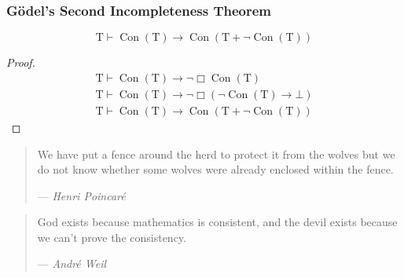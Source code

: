 \documentclass[UTF8,aspectratio=43,11pt,colorlinks,compress,openany]{beamer}%
\begin{document}
\begin{frame}\frametitle{G\"odel's Second Incompleteness Theorem}
\setlength\abovedisplayskip{0pt}
\setlength\belowdisplayskip{0pt}
	\begin{block}{}
		\[\mathrm{T}\vdash\operatorname{Con}(\mathrm{T})\to\operatorname{Con}(\mathrm{T}+\neg\operatorname{Con}(\mathrm{T}))\]
	\end{block}
	\begin{proof}
		\begin{gather*}
		\mathrm{T}\vdash\operatorname{Con}(\mathrm{T})\to\neg\Box \operatorname{Con}(\mathrm{T})\\
		\mathrm{T}\vdash\operatorname{Con}(\mathrm{T})\to\neg\Box (\neg\operatorname{Con}(\mathrm{T})\to\bot)\\
		\mathrm{T}\vdash\operatorname{Con}(\mathrm{T})\to\operatorname{Con}(\mathrm{T}+\neg\operatorname{Con}(\mathrm{T}))
		\end{gather*}
	\end{proof}
\begin{quote}
We have put a fence around the herd to protect it from the wolves but we do not know whether some wolves were already enclosed within the fence.\par\hfill
--- \textsl{Henri Poincar\'e}
\end{quote}
\begin{quote}
	God exists because mathematics is consistent, and the devil exists because we can't prove the consistency. \par
		\hfill --- \textsl{Andr\'e Weil}
\end{quote}
\end{frame}
\end{document}
